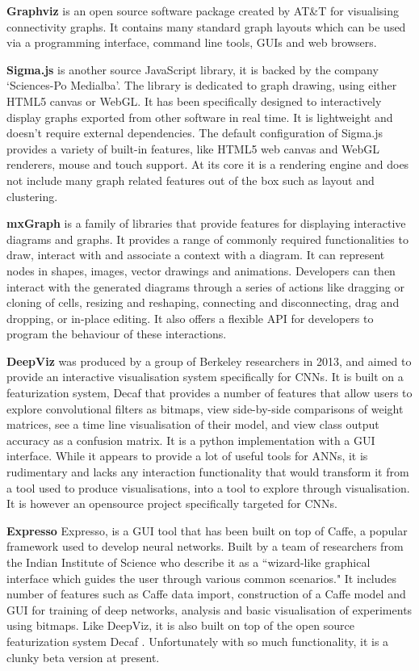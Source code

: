 \documentclass[a4paper,11pt,titlepage]{article}
\begin{document}
		\par 
		\textbf{Graphviz} is an open source software package created by AT\&T for visualising connectivity graphs. It contains many standard graph layouts which can be used via a programming interface, command line tools, GUIs and web browsers.
		\par 
		\textbf{Sigma.js}
		is another source JavaScript library, it is backed by the company `Sciences-Po Medialba'. The library is dedicated to graph drawing, using either HTML5 canvas or WebGL. It has been specifically designed to interactively display graphs exported from other software in real time. It is lightweight and doesn't require external dependencies. The default configuration of Sigma.js provides a variety of built-in features, like HTML5 web canvas and WebGL renderers, mouse and touch support. At its core it is a rendering engine and does not include many graph related features out of the box such as layout and clustering.
		\par 
		\textbf{mxGraph}
		is a family of libraries that provide features for displaying interactive diagrams and graphs. It provides a range of commonly required functionalities to draw, interact with and associate a context with a diagram. It can represent nodes in shapes, images, vector drawings and animations. Developers can then interact with the generated diagrams through a series of actions like dragging or cloning of cells, resizing and reshaping, connecting and disconnecting, drag and dropping, or in-place editing. It also offers a flexible API for developers to program the behaviour of these interactions. 
		\par 
		\textbf{DeepViz} was produced by a group of Berkeley researchers\cite{Bruckner2013} in 2013, and aimed to provide an interactive visualisation system specifically for CNNs. It is built on a featurization system, Decaf\cite{Donahue2013} that provides a number of features that allow users to explore convolutional filters as bitmaps, view side-by-side comparisons of weight matrices, see a time line visualisation of their model, and view class output accuracy as a confusion matrix. It is a python implementation with a GUI interface. While it appears to provide a lot of useful tools for ANNs, it is rudimentary and lacks any interaction functionality that would transform it from a tool used to produce visualisations, into a tool to explore through visualisation. It is however an opensource project specifically targeted for CNNs.
		\par 
		\textbf{Expresso}
		Expresso, is a GUI tool that has been built on top of Caffe, a popular framework used to develop neural networks. Built by a team of researchers from the Indian Institute of Science \cite{Dholakiya2015} who describe it as a ``wizard-like graphical interface which guides the user through various common scenarios." It includes number of features such as Caffe data import, construction of a Caffe model and GUI for training of deep networks, analysis and basic visualisation of experiments using bitmaps. Like DeepViz, it is also built on top of the open source featurization system Decaf \cite{Donahue2013}. Unfortunately with so much functionality, it is a clunky beta version at present.
\end{document}
